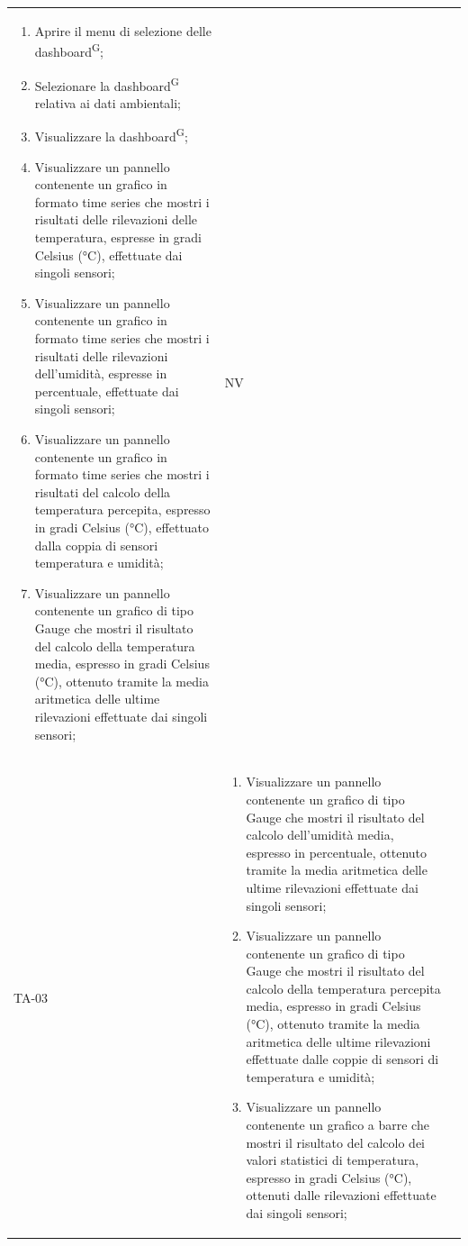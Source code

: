 \documentclass[8pt]{article}
\newcommand{\glossterm}[1]{#1\textsuperscript{G}} %
\begin{document}
\begin{longtable}{|>{\centering}p{2cm}|>{\RaggedRight}m{12cm}|>{\centering\arraybackslash}p{2cm}|}
\begin{enumerate}
        \setlength\itemsep{0em}
        \item Aprire il menu di selezione delle \glossterm{dashboard};
        \item Selezionare la \glossterm{dashboard} relativa ai dati ambientali;
        \item Visualizzare la \glossterm{dashboard};
        \item Visualizzare un pannello contenente un grafico in formato time series che mostri i
            risultati delle rilevazioni delle temperatura, espresse in gradi Celsius (°C),
            effettuate dai singoli sensori;
        \item Visualizzare un pannello contenente un grafico in formato time series che mostri i
            risultati delle rilevazioni dell’umidità, espresse in percentuale, effettuate dai
            singoli sensori;
        \item Visualizzare un pannello contenente un grafico in formato time series che mostri i
            risultati del calcolo della temperatura percepita, espresso in gradi Celsius (°C),
            effettuato dalla coppia di sensori temperatura e umidità;
        \item Visualizzare un pannello contenente un grafico di tipo Gauge che mostri il risultato
            del calcolo della temperatura media, espresso in gradi Celsius (°C), ottenuto tramite la
            media aritmetica delle ultime rilevazioni effettuate dai singoli sensori;
        \end{enumerate}
        & NV \\
        TA-03 &
        \begin{enumerate}[start=8]
        \item Visualizzare un pannello contenente un grafico di tipo Gauge che mostri il risultato
            del calcolo dell'umidità media, espresso in percentuale, ottenuto tramite la
            media aritmetica delle ultime rilevazioni effettuate dai singoli sensori;
        \item Visualizzare un pannello contenente un grafico di tipo Gauge che mostri il risultato
            del calcolo della temperatura percepita media, espresso in gradi Celsius (°C), ottenuto tramite la
            media aritmetica delle ultime rilevazioni effettuate dalle coppie di sensori di temperatura e umidità;
        \item Visualizzare un pannello contenente un grafico a barre che mostri il risultato
            del calcolo dei valori statistici di temperatura, espresso in gradi Celsius (°C), ottenuti dalle rilevazioni effettuate dai singoli sensori;

\end{enumerate}
\end{longtable}
\end{document}
